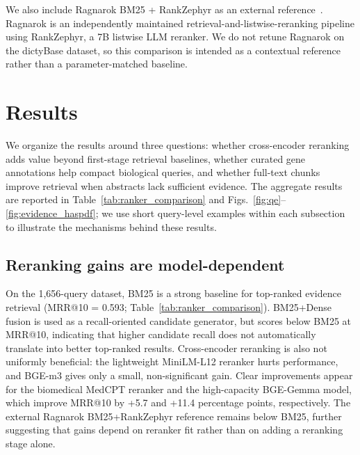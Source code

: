 \documentclass[runningheads]{llncs}
\begin{document}
We also include Ragnarok BM25 + RankZephyr as an external reference~\cite{pradeep_ragnarok_2025,pradeep_rankzephyr_2023}. Ragnarok is an independently maintained retrieval-and-listwise-reranking pipeline using RankZephyr, a 7B listwise LLM reranker. We do not retune Ragnarok on the dictyBase dataset, so this comparison is intended as a contextual reference rather than a parameter-matched baseline.


\section{Results}
\label{sec:results}

We organize the results around three questions: whether cross-encoder reranking
adds value beyond first-stage retrieval baselines, whether curated gene
annotations help compact biological queries, and whether full-text chunks improve
retrieval when abstracts lack sufficient evidence. The aggregate results are reported in Table~\ref{tab:ranker_comparison} and Figs.~\ref{fig:qe}--\ref{fig:evidence_haspdf};
we use short query-level examples within each subsection to illustrate the mechanisms behind these results.

\subsection{Reranking gains are model-dependent}
\label{sec:results_reranking}
On the 1,656-query dataset, BM25 is a strong baseline for top-ranked evidence
retrieval (MRR@10 = 0.593; Table~\ref{tab:ranker_comparison}). BM25+Dense fusion
is used as a recall-oriented candidate generator, but
scores below BM25 at MRR@10, indicating that higher candidate recall does not automatically translate into better top-ranked results. Cross-encoder reranking is also not uniformly beneficial:
the lightweight MiniLM-L12 reranker hurts performance, and BGE-m3 gives
only a small, non-significant gain. Clear improvements appear for the biomedical
MedCPT reranker and the high-capacity BGE-Gemma model, which improve MRR@10 by
+5.7 and +11.4 percentage points, respectively. The external Ragnarok
BM25+RankZephyr reference remains below BM25, further suggesting that gains
depend on reranker fit rather than on adding a reranking stage alone.
\end{document}
